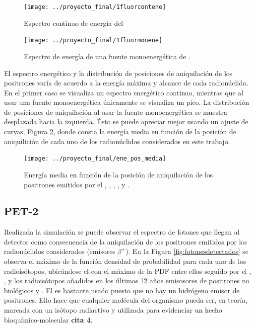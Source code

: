 \documentclass[12pt,a4paper,onecolumn]{article}
\begin{document}
\begin{figure}[H]
\centering
  \begin{minipage}{0.45\textwidth}
	\centering
    \texttt{[image: ../proyecto\_final/1fluorcontene]}
    \caption{Espectro continuo de energía del }
  \end{minipage}
  \hspace{5mm}
  \begin{minipage}{0.45\textwidth}
	\centering
	\texttt{[image: ../proyecto\_final/1fluormonene]}
	\caption{Espectro de energía de una fuente monoenergética de .}
	\label{fig:1fluormonene}
  \end{minipage}	
\end{figure}
El espectro energético y la distribución de posiciones de aniquilación de los positrones varía de acuerdo a la energía máxima y alcance de cada radionúclido. En el primer caso se visualiza un espectro energético continuo, mientras que al usar una fuente monoenergética únicamente se visualiza un pico. La distribución de posiciones de aniquilación al usar la fuente monoenergética se muestra desplazada hacia la izquierda. Ésto se puede apreciar mejor usando un ajuste de curvas, Figura \ref{fig:eneposmedia}, donde consta la energía media en función de la posición de aniquilición de cada uno de los radionúclidos considerados en este trabajo. 
\begin{figure}[H]
	\centering
	\texttt{[image: ../proyecto\_final/ene\_pos\_media]}
	\caption{Energía media en función de la posición de aniquilación de los positrones emitidos por el , , , ,  y .}
	\label{fig:eneposmedia}
\end{figure}
\subsection*{PET-2} 
Realizada la simulación se puede observar el espectro de fotones que llegan al detector como consecuencia de la aniquilación de los positrones emitidos por los radionúclidos considerados (emisores $\beta^+$). En la Figura \ref{fig:fotonesdetectados} se observa el máximo de la función densidad de probabilidad para cada uno de los radioisótopos, ubicándose el  con el máximo de la PDF entre ellos seguido por el , ,  y los radioisótopos añadidos en los últimos 12 años emisosores de positrones no biológicos  y . El  es bastante usado puesto que no hay un hidrógeno emisor de positrones. Ello hace que cualquier molécula del organismo pueda ser, en teoría, marcada con un isótopo radiactivo y utilizada para evidenciar un hecho bioquímico-molecular \textbf{cita 4}. 
\end{document}
